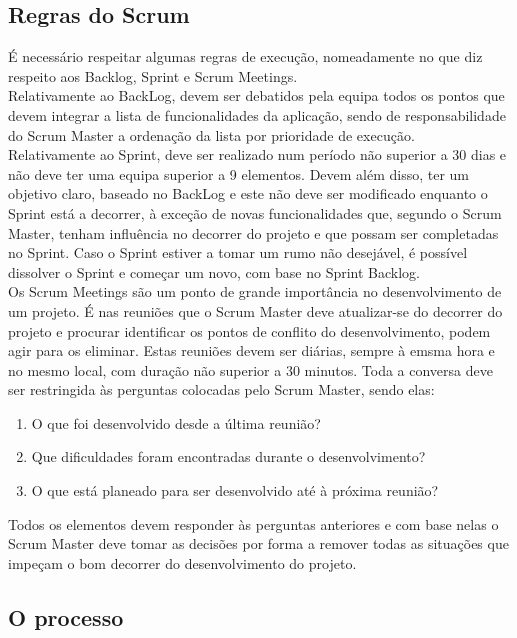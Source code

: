 \subsection{Regras do Scrum}

É necessário respeitar algumas regras de execução, nomeadamente no que diz respeito aos Backlog, Sprint e Scrum Meetings.
\\
Relativamente ao BackLog, devem ser debatidos pela equipa todos os pontos que devem integrar a lista de funcionalidades da aplicação, sendo de responsabilidade do Scrum Master a ordenação da lista por prioridade de execução.
\\
Relativamente ao Sprint, deve ser realizado num período não superior a 30 dias e não deve ter uma equipa superior a 9 elementos. Devem além disso, ter um objetivo claro, baseado no BackLog e este não deve ser modificado enquanto o Sprint está a decorrer, à exceção de novas funcionalidades que, segundo o Scrum Master, tenham influência no decorrer do projeto e que possam ser completadas no Sprint. Caso o Sprint estiver a tomar um rumo não desejável, é possível dissolver o Sprint e começar um novo, com base no Sprint
Backlog.
\\
Os Scrum Meetings são um ponto de grande importância no desenvolvimento de um projeto. É nas reuniões que o Scrum Master deve atualizar-se do decorrer do projeto e procurar identificar os pontos de conflito do desenvolvimento, podem agir para os eliminar. Estas reuniões devem ser diárias, sempre à emsma hora e no mesmo local, com duração não superior a 30 minutos. Toda a conversa deve ser restringida às perguntas colocadas pelo Scrum Master, sendo elas:

\begin{enumerate}
    \item O que foi desenvolvido desde a última reunião?
    \item Que dificuldades foram encontradas durante o desenvolvimento?
    \item O que está planeado para ser desenvolvido até à próxima reunião?
\end{enumerate}

Todos os elementos devem responder às perguntas anteriores e com base nelas o Scrum Master deve tomar as decisões por forma a remover todas as situações que impeçam o bom decorrer do desenvolvimento do projeto.

\subsection{O processo}

